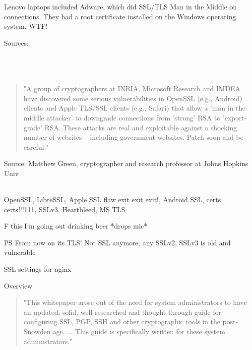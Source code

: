 \documentclass[20pt,landscape,a4paper,footrule]{foils}
\begin{document}
Lenovo laptops included Adware, which did SSL/TLS Man in the Middle on connections.
They had a root certificate installed on the Windows operating system, WTF!

{\footnotesize Sources:\\
\\
\\
\\
}{\tiny{}
}




\begin{quote}
"A group of cryptographers at INRIA, Microsoft Research and IMDEA have discovered some serious vulnerabilities in OpenSSL (e.g., Android) clients and Apple TLS/SSL clients (e.g., Safari) that allow a 'man in the middle attacker' to downgrade connections from 'strong' RSA to 'export-grade' RSA. These attacks are real and exploitable against a shocking number of websites -- including government websites. Patch soon and be careful."
\end{quote}

Source: Matthew Green, cryptographer and research professor at Johns Hopkins Univ\\
{\footnotesize{}\\
 
}


OpenSSL, LibreSSL, Apple SSL flaw exit exit exit!, Android SSL, certs certs!!!111, SSLv3, Heartbleed, MS TLS

\vskip 1cm
\centerline{F this I'm going out drinking beer *drops mic*}



\vskip 1cm
PS From now on its TLS! Not SSL anymore, any SSLv2, SSLv3 is old and vulnerable



SSL settings for nginx

Overview
\begin{quote}
"This whitepaper arose out of the need for system administrators to have an updated,
solid, well researched and thought-through guide for configuring SSL, PGP, SSH and
other cryptographic tools in the post-Snowden age. ... This guide is specifically
written for these system administrators."
\end{quote}
\end{document}
